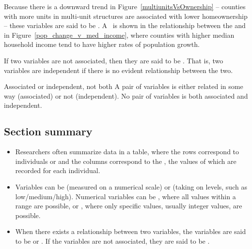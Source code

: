 Because there is a downward trend in
Figure~\ref{multiunitsVsOwnership} --
counties with more units in multi-unit structures
are associated with lower homeownership --
these variables are said to be
.
A~ is shown in the relationship
between the
and 
in Figure~\ref{pop_change_v_med_income},
where counties with higher median household income tend
to have higher rates of population growth.

If two variables are not associated,
then they are said to be .
That is, two variables are independent if there
is no evident relationship between the two.

\begin{onebox}{Associated or independent, not both}
A pair of variables is either related in some way (associated) or not (independent). No pair of variables is both associated and independent.
\end{onebox}






\D{\newpage}

\subsection*{Section summary}
\begin{itemize}
\item Researchers often summarize data in a table, where the rows correspond to individuals or  and the columns correspond to the , the values of which are recorded for each individual.

\item Variables can be  (measured on a numerical scale) or  (taking on levels, such as low/medium/high).  Numerical variables can be , where all values within a range are possible, or , where only specific  values, usually integer values, are possible.

\item When there exists a relationship between two variables, the variables are said to be  or .  If the variables are not associated, they are said to be .

\end{itemize}



